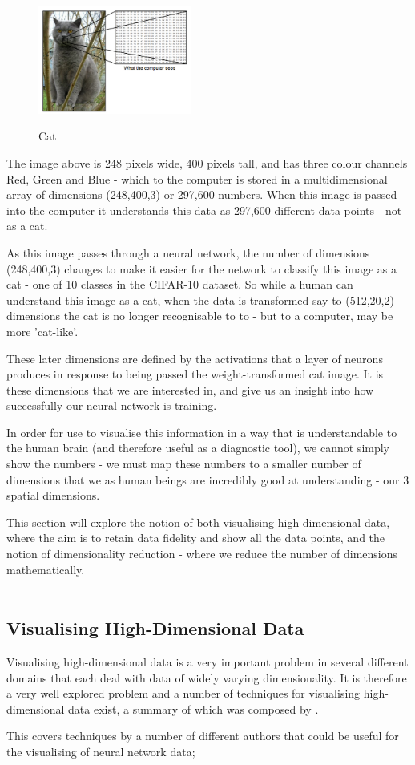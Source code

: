 \documentclass[a4paper,11pt,titlepage]{article}
\begin{document}
 	\begin{figure}[H]
    			\centering	
			{{\includegraphics[width=0.45\textwidth]
    				{img/catimage.png} 
    			}}%
    			\caption{Cat}%
    		\label{fig:lascaux}
	\end{figure}
	
	The image above is 248 pixels wide, 400 pixels tall, and has three colour channels Red, Green and Blue - which to the computer is stored in a multidimensional array of dimensions (248,400,3) or 297,600 numbers. When this image is passed into the computer it understands this data as 297,600 different data points - not as a cat.
	\par 
	As this image passes through a neural network, the number of dimensions (248,400,3) changes to make it easier for the network to classify this image as a cat - one of 10 classes in the CIFAR-10 dataset. So while a human can understand this image as a cat, when the data is transformed say to (512,20,2) dimensions the cat is no longer recognisable to to - but to a computer, may be more 'cat-like'.
	\par 
	These later dimensions are defined by the activations that a layer of neurons produces in response to being passed the weight-transformed cat image. It is these dimensions that we are interested in, and give us an insight into how successfully our neural network is training. 
	\par 
	In order for use to visualise this information in a way that is understandable to the human brain (and therefore useful as a diagnostic tool), we cannot simply show the numbers - we must map these numbers to a smaller number of dimensions that we as human beings are incredibly good at understanding - our 3 spatial dimensions. 
	\par 
	This section will explore the notion of both visualising high-dimensional data, where the aim is to retain data fidelity and show all the data points, and the notion of dimensionality reduction - where we reduce the number of dimensions mathematically.
\\\
\subsection{Visualising High-Dimensional Data}
	Visualising high-dimensional data is a very important problem in several different domains that each deal with data of widely varying dimensionality. It is therefore a very well explored problem and a number of techniques for visualising high-dimensional data exist, a summary of which was composed by \cite{Cristina2003}.
	\par 
	This covers techniques by a number of different authors that could be useful for the visualising of neural network data;	
		\par
		
\end{document}
